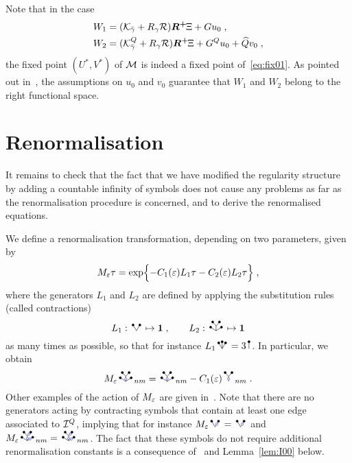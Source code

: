 \documentclass[reqno,11pt]{article}
\def\unit{\vone}
\def\Rplus{\boldsymbol{R^+}\hspace{-.1em}}
\begin{document}
Note that in the case  
\begin{align}
\nonumber
W_1 &= (\cK_{\bar\gamma}+R_\gamma\cR)\Rplus \Xi + Gu_0\;, \\
W_2 &= (\cK^Q_{\bar\gamma}+R_\gamma\cR)\Rplus \Xi + G^Q u_0 + \widehat Q v_0\;,
\end{align}
the fixed point $(U^*,V^*)$ of ${\mathcal M}$ is indeed a fixed point 
of~\eqref{eq:fix01}. As pointed out in~\cite[Rem.~5.7]{BK2016}, the assumptions 
on $u_0$ and $v_0$ guarantee that $W_1$ and $W_2$ belong to the right 
functional space.


\section{Renormalisation}
\label{sec:renormalisation} 

It remains to check that the fact that we have modified the regularity 
structure by adding a countable infinity of symbols does not cause any problems 
as far as the renormalisation procedure is concerned, and to derive the 
renormalised equations. 

We define a renormalisation transformation, depending on two parameters, given 
by 
\begin{equation}
 M_\varepsilon\tau = \exp \Bigl\{-C_1(\varepsilon) L_1\tau - C_2(\varepsilon) L_2\tau\Bigr\}\;, 
\end{equation} 
where the generators $L_1$ and $L_2$ are defined by applying the substitution 
rules (called contractions)
\begin{equation}
 L_1 : \RSV \mapsto \unit\;, 
 \qquad 
 L_2 : \RSWV \mapsto \unit
\end{equation} 
as many times as possible, so that for instance $L_1 \RSW = 3 \RSI$. In 
particular, we obtain 
\begin{equation}
 M_\eps \RSoWV_{nm} = \RSoWV_{nm} - C_1(\eps) \RSoY_{nm}\;.
\end{equation} 
Other examples of the action of $M_\varepsilon$ are given in~\cite[(6.12)]{BK2016}. 
Note that there are no generators acting by contracting symbols that 
contain at least one edge associated to ${\mathcal I}^Q$, implying that for instance 
$M_\eps\RSVo = \RSVo$ and $M_\eps\RSoWoVo_{nm} = \RSoWoVo_{nm}$. 
The fact that these symbols do not require additional 
renormalisation constants is a consequence of~\cite[Lem.~6.2]{BK2016} and 
Lemma~\ref{lem:I00} below.
\end{document}
